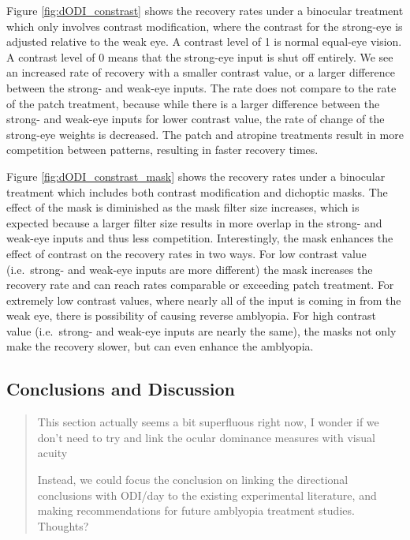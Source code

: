 \documentclass[
  onecolumn]{article}
\begin{document}
Figure \ref{fig:dODI_constrast} shows the recovery rates under a
binocular treatment which only involves contrast modification, where the
contrast for the strong-eye is adjusted relative to the weak eye. A
contrast level of 1 is normal equal-eye vision. A contrast level of 0
means that the strong-eye input is shut off entirely. We see an
increased rate of recovery with a smaller contrast value, or a larger
difference between the strong- and weak-eye inputs. The rate does not
compare to the rate of the patch treatment, because while there is a
larger difference between the strong- and weak-eye inputs for lower
contrast value, the rate of change of the strong-eye weights is
decreased. The patch and atropine treatments result in more competition
between patterns, resulting in faster recovery times.

Figure \ref{fig:dODI_constrast_mask} shows the recovery rates under a
binocular treatment which includes both contrast modification and
dichoptic masks. The effect of the mask is diminished as the mask filter
size increases, which is expected because a larger filter size results
in more overlap in the strong- and weak-eye inputs and thus less
competition. Interestingly, the mask enhances the effect of contrast on
the recovery rates in two ways. For low contrast value (i.e.~strong- and
weak-eye inputs are more different) the mask increases the recovery rate
and can reach rates comparable or exceeding patch treatment. For
extremely low contrast values, where nearly all of the input is coming
in from the weak eye, there is possibility of causing reverse amblyopia.
For high contrast value (i.e.~strong- and weak-eye inputs are nearly the
same), the masks not only make the recovery slower, but can even enhance
the amblyopia.

\hypertarget{conclusions-and-discussion}{%
\subsection{Conclusions and
Discussion}\label{conclusions-and-discussion}}

\begin{quote}
This section actually seems a bit superfluous right now, I wonder if we
don't need to try and link the ocular dominance measures with visual
acuity

Instead, we could focus the conclusion on linking the directional
conclusions with ODI/day to the existing experimental literature, and
making recommendations for future amblyopia treatment studies. Thoughts?
\end{quote}
\end{document}
